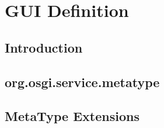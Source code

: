 \section{GUI Definition}
\subsection{Introduction}
\subsection{org.osgi.service.metatype}
\subsection{MetaType Extensions}
